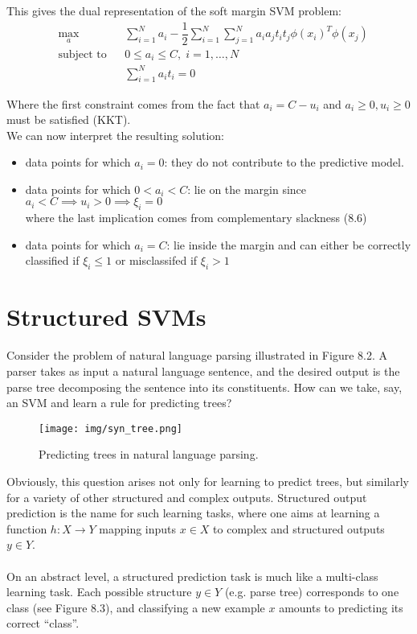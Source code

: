 \documentclass[twoside]{article}
\begin{document}
This gives the dual representation of the soft margin SVM problem:
\begin{equation*}
\begin{aligned}
& \underset{a}{\text{max}}
& & \sum_{i=1}^{N} a_{i}  - \dfrac{1}{2}
    \sum_{i=1}^{N} { \sum_{j=1}^{N} a_{i} a_{j} t_{i} t_{j} \phi(x_{i})^T \phi(x_{j})}\\
& \text{subject to}
& & 0 \leq a_{i} \leq C  , \; i = 1, \ldots, N \\
&&& \sum_{i=1}^{N} a_{i}t_{i} = 0
\end{aligned}
\end{equation*}

Where the first constraint comes from the fact that $a_{i} = C - u_{i}$ and $a_{i} \geq 0, u_{i} \geq 0$ must be satisfied (KKT).
\\

We can now interpret the resulting solution:
\begin{itemize}
    \item data points for which $a_{i} = 0$: they do not contribute to the predictive model.
    \item data points for which $0 < a_{i} < C$: lie on the margin since $a_{i} < C \implies u_{i} > 0 \implies \xi_{i} = 0$  \\ where the last implication comes from complementary slackness (8.6)
    \item data points for which $a_{i} = C$: lie inside the margin and can either be correctly classified if $\xi_{i} \leq 1$ or misclassifed if $\xi_{i} > 1$
\end{itemize}
\newpage


\section{Structured SVMs}
Consider the problem of natural language parsing illustrated in Figure 8.2. A parser takes as input a natural
language sentence, and the desired output is the parse tree
decomposing the sentence into its constituents. How can we take, say,
an SVM and learn a rule for predicting trees?

\begin{figure}[h]
\caption{Predicting trees in natural language parsing.}
\centering
\texttt{[image: img/syn\_tree.png]}
\end{figure}


Obviously, this question arises not only for learning to
predict trees, but similarly for a variety of other structured
and complex outputs. Structured output prediction is the
name for such learning tasks, where one aims at learning
a function $h : X \rightarrow Y$ mapping inputs $x \in X$ to complex
and structured outputs $y \in Y$. 
\\ \\ On an abstract level, a structured prediction task is much like
a multi-class learning task. Each possible structure $y \in Y$
(e.g. parse tree) corresponds to one class (see Figure 8.3), and
classifying a new example $x$ amounts to predicting its correct
“class”. 
\end{document}
